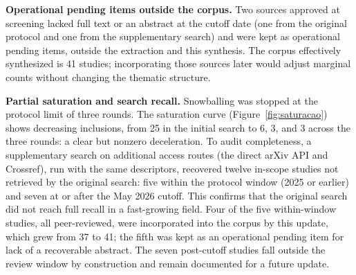 \noindent\textbf{Operational pending items outside the corpus.} Two sources approved at screening lacked full text or an abstract at the cutoff date (one from the original protocol and one from the supplementary search) and were kept as operational pending items, outside the extraction and this synthesis. The corpus effectively synthesized is 41 studies; incorporating those sources later would adjust marginal counts without changing the thematic structure.

\noindent\textbf{Partial saturation and search recall.} Snowballing was stopped at the protocol limit of three rounds. The saturation curve (Figure~\ref{fig:saturacao}) shows decreasing inclusions, from 25 in the initial search to 6, 3, and 3 across the three rounds: a clear but nonzero deceleration. To audit completeness, a supplementary search on additional access routes (the direct arXiv API and Crossref), run with the same descriptors, recovered twelve in-scope studies not retrieved by the original search: five within the protocol window (2025 or earlier) and seven at or after the May 2026 cutoff. This confirms that the original search did not reach full recall in a fast-growing field. Four of the five within-window studies, all peer-reviewed, were incorporated into the corpus by this update, which grew from 37 to 41; the fifth was kept as an operational pending item for lack of a recoverable abstract. The seven post-cutoff studies fall outside the review window by construction and remain documented for a future update.
